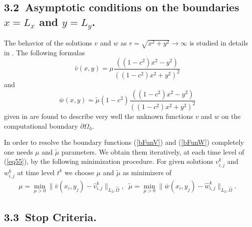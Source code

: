 \documentclass[leqno,11pt]{book}
\newcommand{\rf}[1]{(\ref{#1})}
\newcommand{\dO}{\partial\Omega_{h}}
\begin{document}
\subsection{3.2~Asymptotic conditions on the  boundaries $x=L_x$ and $y=L_y$.}

The behavior of the solutions $v$ and $w$  as $r =\sqrt{x^2 +y^2} \rightarrow \infty$ is studied in details in \cite{bnd,Ch2011,Ch2012}. The following formulas  
\begin{equation}\label{bFunV}
\bar{v}(x,y) = \mu \frac{( (1-c^2)x^2-y^2 )}{((1-c^2)x^2 + y^2)^2 }
\end{equation}
and
\begin{equation}\label{bFunW}
\bar{w}(x,y) =\tilde {\mu} (1-c^2) \frac{( (1-c^2)x^2-y^2 )}{((1-c^2)x^2 + y^2)^2 }
\end{equation}
given in \cite{bnd} are found to describe very well the unknown functions $v$ and $w$ on the computational boundary $\dO$. 

In order to resolve the boundary functions \rf{bFunV} and \rf{bFunW} completely one needs $\mu$ and $\tilde {\mu}$ parameters.
We obtain them iteratively, at each time level of \rf{eq55}, by the following minimization procedure. For  given solutions  $v^k_{i,j}$ and $ w^k_{i,j}$ at time level $t^k$ 
we choose $\mu$ and $\tilde {\mu}$ as minimizers of 
\begin{equation}\label{mu}
\begin{split}
\mu = \underset{\mu>0 }{\operatorname{min} } \| \bar{v}(x_i,y_j) - \widehat{v}^k_{i,j} \|_{L_2,\widehat{\Omega}},
\;\;
\tilde {\mu} = \underset{\mu>0 }{\operatorname{min} } \| \bar{w}(x_i,y_j) -\widehat{w}^k_{i,j} \|_{L_2,\widehat{\Omega}}.
\end{split}
\end{equation}
 
\subsection{3.3~Stop Criteria.}
\end{document}

